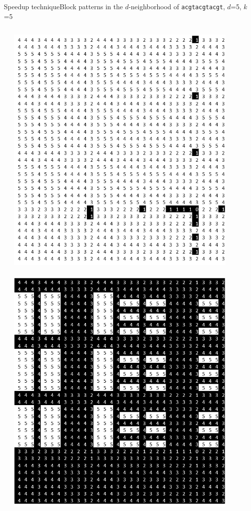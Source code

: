 \documentclass[pdf,xcolor={dvipsnames}]{beamer}
\begin{document}
\begin{frame}{Speedup technique}{Block patterns in the $d$-neighborhood of \texttt{acgtacgtacgt}, $d$=5, $k$=5}
\begin{columns}
\begin{column}{0.33\textwidth}
			\end{column}
			\begin{column}{0.33\textwidth}
				\includegraphics[width=0.9\textwidth]{img/1.png}\\\ \\
				\includegraphics[width=0.9\textwidth]{img/4.png}

\end{column}
\end{columns}
\end{frame}
\end{document}
